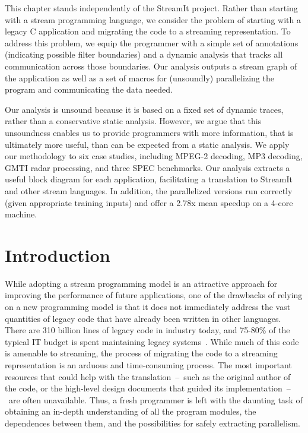 \newcommand{\meanspeedup}[0]{2.78x}

\label{chap:profiling}

This chapter stands independently of the StreamIt project.  Rather
than starting with a stream programming language, we consider the
problem of starting with a legacy C application and migrating the code
to a streaming representation.  To address this problem, we equip the
programmer with a simple set of annotations (indicating possible
filter boundaries) and a dynamic analysis that tracks all
communication across those boundaries.  Our analysis outputs a stream
graph of the application as well as a set of macros for (unsoundly)
parallelizing the program and communicating the data needed.

Our analysis is unsound because it is based on a fixed set of dynamic
traces, rather than a conservative static analysis.  However, we argue
that this unsoundness enables us to provide programmers with more
information, that is ultimately more useful, than can be expected from
a static analysis.  We apply our methodology to six case studies,
including MPEG-2 decoding, MP3 decoding, GMTI radar processing, and
three SPEC benchmarks.  Our analysis extracts a useful block diagram
for each application, facilitating a translation to StreamIt and other
stream languages.  In addition, the parallelized versions run
correctly (given appropriate training inputs) and offer a
{\meanspeedup} mean speedup on a 4-core machine.

\section{Introduction}

While adopting a stream programming model is an attractive approach
for improving the performance of future applications, one of the
drawbacks of relying on a new programming model is that it does not
immediately address the vast quantities of legacy code that have
already been written in other languages.  There are 310 billion lines
of legacy code in industry today, and 75-80\% of the typical IT budget
is spent maintaining legacy systems~\cite{legacy}.  While much of this
code is amenable to streaming, the process of migrating the code to a
streaming representation is an arduous and time-consuming process.
The most important resources that could help with the
translation~--~such as the original author of the code, or the
high-level design documents that guided its implementation~--~are
often unavailable.  Thus, a fresh programmer is left with the daunting
task of obtaining an in-depth understanding of all the program
modules, the dependences between them, and the possibilities for
safely extracting parallelism.

